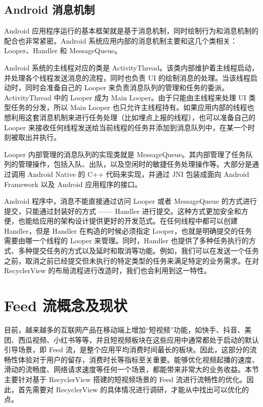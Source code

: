 
\subsection{Android 消息机制}

Android 应用程序运行的基本框架就是基于消息机制，同时绘制行为和消息机制的配合也非常紧密。Android 系统应用内部的消息机制主要和这几个类相关：Looper、Handler 和 MessageQueue。

Android 系统的主线程对应的类是 ActivityThread。该类内部维护着主线程启动，并处理各个线程发送消息的流程，同时也负责 UI 的绘制消息的处理。当该线程启动时，同时会准备自己的 Looper 来负责消息队列的管理和任务的委派。ActivityThread 中的 Looper 成为 Main Looper。由于只能由主线程来处理 UI 类型任务的分发，所以 Main Looper 也只允许主线程持有。如果应用内部的线程也想利用这套消息机制来进行任务处理（比如埋点上报的线程），也可以准备自己的 Looper 来接收任何线程发送给当前线程的任务并添加到消息队列中，在某一个时刻被取出并执行。

Looper 内部管理的消息队列的实现类就是 MessageQueue。其内部管理了任务队列的管理操作，包括入队、出队，以及空闲时的敏捷任务处理操作等。大部分是通过调用 Android Native 的 C++ 代码来实现，并通过 JNI 包装成面向 Android Framework 以及 Android 应用程序的接口。

Android 程序中，消息不能直接通过访问 Looper 或者 MessageQueue 的方式进行提交，只能通过封装好的方式 —— Handler 进行提交。这种方式更加安全和方便，也能给应用的架构设计提供更好的开发范式。在任何线程中都可以创建 Handler，但是 Handler 在构造的时候必须指定 Looper，也就是明确提交的任务需要由哪一个线程的 Looper 来管理\cite{fan2018efficiently}。同时，Handler 也提供了多种任务执行的方式、多种提交任务的方式以及延时和取消等功能。例如，我们可以在发送一个任务之前，取消之前已经提交但未执行的特定类型的任务来满足特定的业务需求。在对 RecyclerView 的布局流程进行改造时，我们也会利用到这一特性。

\section{Feed 流概念及现状}

目前，越来越多的互联网产品在移动端上增加“短视频”功能，如快手、抖音、美团、西瓜视频、小红书等等，并且短视频板块在这些应用中通常都处于启动的默认引导场景，即 Feed 流，是整个应用平均消费时间最长的板块。因此，这部分的流畅性体验对于用户的留存，消费时长等指标至关重要。能够优化视频起播的速度、滑动的流畅度、网络请求速度等任何一个场景，都能带来非常大的业务收益。本节主要针对基于 RecyclerView 搭建的短视频场景的 Feed 流进行流畅性的优化。因此，首先需要对 RecyclerView 的具体情况进行调研，才能从中找出可以优化的点。

